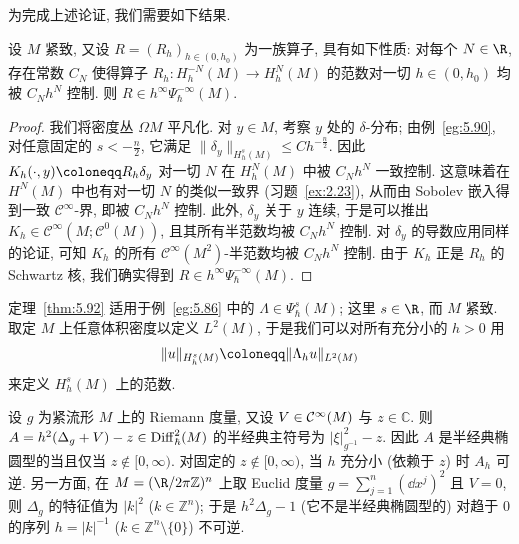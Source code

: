 为完成上述论证, 我们需要如下结果.

\begin{lemma}[由映射性质刻画残余算子]\label{lem:5.93}
设 $M$ 紧致, 又设 $R = (R_h)_{h \in (0, h_0)}$ 为一族算子, 具有如下性质: 对每个 $N \in \R$, 存在常数 $C_N$ 使得算子 $R_h \colon H_h^{-N}(M) \to H_h^N(M)$ 的范数对一切 $h \in (0, h_0)$ 均被 $C_N h^N$ 控制. 则 $R \in h^\infty \Psi_\hbar^{-\infty}(M)$.
\end{lemma}

\begin{proof}
我们将密度丛 $\Omega M$ 平凡化. 对 $y \in M$, 考察 $y$ 处的 $\delta$-分布; 由例~\ref{eg:5.90}, 对任意固定的 $s < -\frac{n}{2}$, 它满足 $\|\delta_y\|_{H_h^s(M)} \le C h^{-\frac{n}{2}}$. 因此 $K_h(\cdot, y) \defeq R_h \delta_y$ 对一切 $N$ 在 $H_h^N(M)$ 中被 $C_N h^N$ 一致控制. 这意味着在 $H^N(M)$ 中也有对一切 $N$ 的类似一致界 (习题~\ref{ex:2.23}), 从而由 Sobolev 嵌入得到一致 $\mathcal{C}^\infty$-界, 即被 $C_N h^N$ 控制. 此外, $\delta_y$ 关于 $y$ 连续, 于是可以推出 $K_h \in \mathcal{C}^\infty(M; \mathcal{C}^0(M))$, 且其所有半范数均被 $C_N h^N$ 控制. 对 $\delta_y$ 的导数应用同样的论证, 可知 $K_h$ 的所有 $\mathcal{C}^\infty(M^2)$-半范数均被 $C_N h^N$ 控制. 由于 $K_h$ 正是 $R_h$ 的 Schwartz 核, 我们确实得到 $R \in h^\infty \Psi_\hbar^{-\infty}(M)$.
\end{proof}

\begin{example}[位移阶算子]\label{eg:5.94}
定理~\ref{thm:5.92} 适用于例~\ref{eg:5.86} 中的 $\Lambda \in \Psi_\hbar^s(M)$; 这里 $s \in \R$, 而 $M$ 紧致. 取定 $M$ 上任意体积密度以定义 $L^2(M)$, 于是我们可以对所有充分小的 $h > 0$ 用
\begin{equation}\label{eq:5.209}
    \|u\|_{H_h^s(M)} \defeq \|\Lambda_h u\|_{L^2(M)}
\end{equation}
来定义 $H_h^s(M)$ 上的范数.
\end{example}

\begin{example}[谱族]\label{eg:5.95}
设 $g$ 为紧流形 $M$ 上的 Riemann 度量, 又设 $V \in \mathcal{C}^\infty(M)$ 与 $z \in \mathbb{C}$. 则 $A = h^2 (\Delta_g + V) - z \in \operatorname{Diff}_\hbar^2(M)$ 的半经典主符号为 $|\xi|_{g^{-1}}^2 - z$. 因此 $A$ 是半经典椭圆型的当且仅当 $z \notin [0, \infty)$. 对固定的 $z \notin [0, \infty)$, 当 $h$ 充分小 (依赖于 $z$) 时 $A_h$ 可逆. 另一方面, 在 $M = (\R / 2\pi\mathbb{Z})^n$ 上取 Euclid 度量 $g = \sum_{j=1}^n (\dd x^j)^2$ 且 $V = 0$, 则 $\Delta_g$ 的特征值为 $|k|^2$ ($k \in \mathbb{Z}^n$); 于是 $h^2 \Delta_g - 1$ (它不是半经典椭圆型的) 对趋于 0 的序列 $h = |k|^{-1}$ ($k \in \mathbb{Z}^n \setminus \{0\}$) 不可逆.
\end{example}

